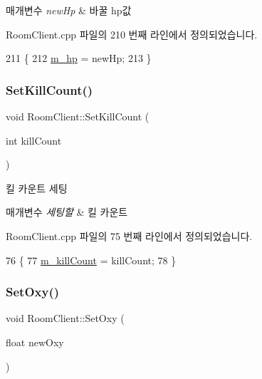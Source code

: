 \begin{DoxyParams}{매개변수}
{\em new\+Hp} & 바꿀 hp값 \\
\hline
\end{DoxyParams}


Room\+Client.\+cpp 파일의 210 번째 라인에서 정의되었습니다.


\begin{DoxyCode}
211 \{
212     \hyperlink{class_room_client_a2b4f07062f9927aa30772306a1b9d18a}{m\_hp} = newHp;
213 \}
\end{DoxyCode}
\mbox{\label{class_room_client_af86bb780657acddb5b79a5fe9b21b134}} 
\subsubsection{\texorpdfstring{Set\+Kill\+Count()}{SetKillCount()}}
{\footnotesize\ttfamily void Room\+Client\+::\+Set\+Kill\+Count (\begin{DoxyParamCaption}\item[{int}]{kill\+Count }\end{DoxyParamCaption})}



킬 카운트 세팅 


\begin{DoxyParams}{매개변수}
{\em 세팅할} & 킬 카운트 \\
\hline
\end{DoxyParams}


Room\+Client.\+cpp 파일의 75 번째 라인에서 정의되었습니다.


\begin{DoxyCode}
76 \{
77     \hyperlink{class_room_client_a221340e3b573d5b8e3c09fcc16bbb01b}{m\_killCount} = killCount;
78 \}
\end{DoxyCode}
\mbox{\label{class_room_client_a2e18fdd17364dc295fd0bd6da61e3727}} 
\subsubsection{\texorpdfstring{Set\+Oxy()}{SetOxy()}}
{\footnotesize\ttfamily void Room\+Client\+::\+Set\+Oxy (\begin{DoxyParamCaption}\item[{float}]{new\+Oxy }\end{DoxyParamCaption})}



